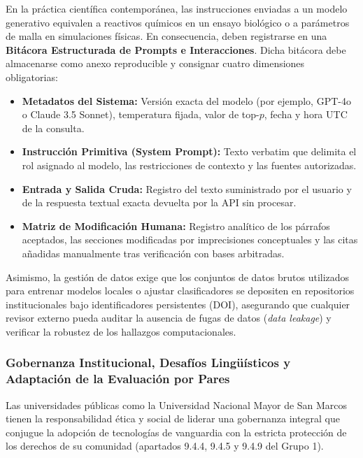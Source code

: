 En la práctica científica contemporánea, las instrucciones enviadas a un modelo generativo equivalen a reactivos químicos en un ensayo biológico o a parámetros de malla en simulaciones físicas. En consecuencia, deben registrarse en una \textbf{Bitácora Estructurada de Prompts e Interacciones}. Dicha bitácora debe almacenarse como anexo reproducible y consignar cuatro dimensiones obligatorias:
\begin{itemize}
    \item \textbf{Metadatos del Sistema:} Versión exacta del modelo (por ejemplo, GPT-4o o Claude 3.5 Sonnet), temperatura fijada, valor de top-$p$, fecha y hora UTC de la consulta.
    \item \textbf{Instrucción Primitiva (System Prompt):} Texto verbatim que delimita el rol asignado al modelo, las restricciones de contexto y las fuentes autorizadas.
    \item \textbf{Entrada y Salida Cruda:} Registro del texto suministrado por el usuario y de la respuesta textual exacta devuelta por la API sin procesar.
    \item \textbf{Matriz de Modificación Humana:} Registro analítico de los párrafos aceptados, las secciones modificadas por imprecisiones conceptuales y las citas añadidas manualmente tras verificación con bases arbitradas.
\end{itemize}

Asimismo, la gestión de datos exige que los conjuntos de datos brutos utilizados para entrenar modelos locales o ajustar clasificadores se depositen en repositorios institucionales bajo identificadores persistentes (DOI), asegurando que cualquier revisor externo pueda auditar la ausencia de fugas de datos (\textit{data leakage}) y verificar la robustez de los hallazgos computacionales.

\subsubsection{Gobernanza Institucional, Desafíos Lingüísticos y Adaptación de la Evaluación por Pares}

Las universidades públicas como la Universidad Nacional Mayor de San Marcos tienen la responsabilidad ética y social de liderar una gobernanza integral que conjugue la adopción de tecnologías de vanguardia con la estricta protección de los derechos de su comunidad (apartados 9.4.4, 9.4.5 y 9.4.9 del Grupo 1).

